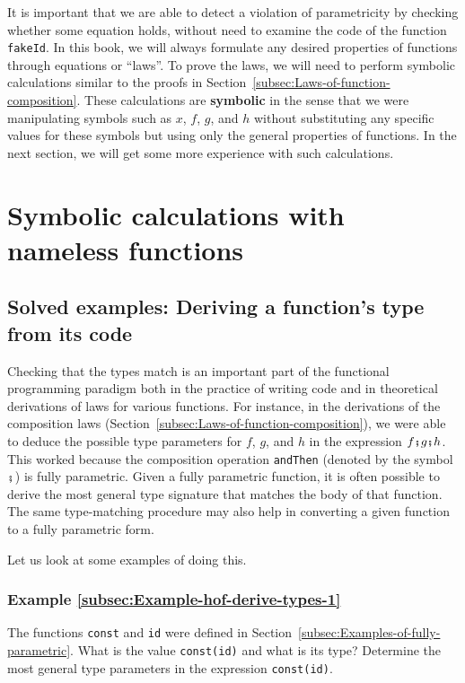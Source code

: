 It is important that we are able to detect a violation of parametricity
by checking whether some equation holds, without need to examine the
code of the function \lstinline!fakeId!. In this book, we will always
formulate any desired properties of functions through equations or
``laws''. To prove the laws, we will need to perform symbolic calculations
similar to the proofs in Section~\ref{subsec:Laws-of-function-composition}.
These calculations are \textbf{symbolic} in the sense that we were
manipulating symbols such as $x$, $f$, $g$, and $h$ without substituting
any specific values for these symbols but using only the general properties
of functions. In the next section, we will get some more experience
with such calculations.

\section{Symbolic calculations with nameless functions}

\subsection{Solved examples: Deriving a function's type from its code}

Checking that the types match is an important part of the functional
programming paradigm \textendash{} both in the practice of writing
code and in theoretical derivations of laws for various functions.
For instance, in the derivations of the composition laws (Section~\ref{subsec:Laws-of-function-composition}),
we were able to deduce the possible type parameters for $f$, $g$,
and $h$ in the expression $f\bef g\bef h$. This worked because the
composition operation \lstinline!andThen! (denoted by the symbol
$\bef$) is fully parametric. Given a fully parametric function, it
is often possible to derive the most general type signature that matches
the body of that function. The same type-matching procedure may also
help in converting a given function to a fully parametric form.

Let us look at some examples of doing this.

\subsubsection{Example \label{subsec:Example-hof-derive-types-1}\ref{subsec:Example-hof-derive-types-1}}

The functions \lstinline!const! and \lstinline!id! were defined
in Section~\ref{subsec:Examples-of-fully-parametric}. What is the
value \lstinline!const(id)! and what is its type? Determine the most
general type parameters in the expression \lstinline!const(id)!.

